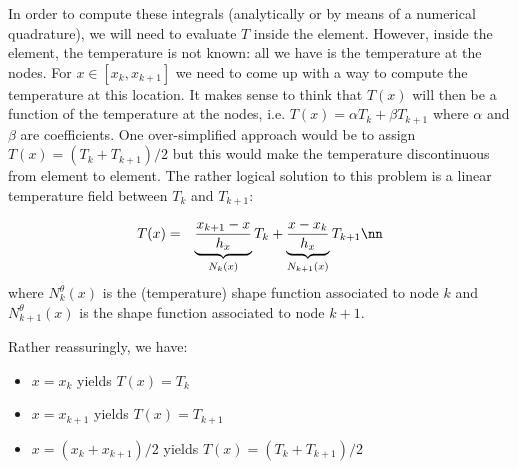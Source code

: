 In order to compute these integrals (analytically or by means of a numerical quadrature), 
we will need to evaluate $T$ inside the element. However, inside the element, 
the temperature is not known: all we have is the temperature at the nodes. 
For $x\in [x_k,x_{k+1}]$ we need to come up with a way to compute the temperature at this location. 
It makes sense to think that $T(x)$ will then be a function of the temperature at the nodes, 
i.e. $T(x) = \alpha T_k + \beta T_{k+1}$ where $\alpha$ and $\beta$ are coefficients. 
One over-simplified approach would be to assign $T(x)=(T_k + T_{k+1})/2$ but this would make the
temperature discontinuous from element to element. 
The rather logical solution to this problem is a linear temperature field between $T_k$
and $T_{k+1}$: 

\begin{eqnarray}
T(x) 
&=& \underbrace{\frac{x_{k+1}-x}{h_x}}_{N_k(x)} T_k 
+ 
\underbrace{\frac{x-x_k}{h_x}}_{N_{k+1}(x)} T_{k+1} \nn
\end{eqnarray}
where $N_k^\theta(x)$ is the (temperature) shape function associated to node $k$ and 
$N_{k+1}^\theta(x)$ is the shape function associated to node $k+1$.

Rather reassuringly, we have:
\begin{itemize}
\item $x=x_k$ yields $T(x)=T_k$
\item $x=x_{k+1}$ yields $T(x)=T_{k+1}$
\item $x=(x_k+x_{k+1})/2$ yields $T(x)=(T_k+T_{k+1})/2$
\end{itemize}



